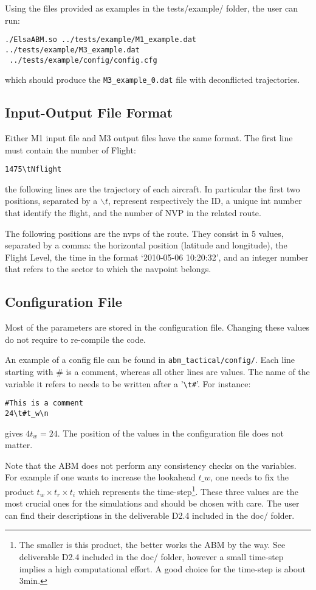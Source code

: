 \documentclass[12pt]{article}
\begin{document}
Using the files provided as examples in the tests/example/ folder, the user can run:
\begin{verbatim}
./ElsaABM.so ../tests/example/M1_example.dat ../tests/example/M3_example.dat
 ../tests/example/config/config.cfg
\end{verbatim}
which should produce the \verb|M3_example_0.dat| file with deconflicted trajectories. 

\subsection{Input-Output File Format}

Either M1 input file and M3 output files have the same format. The first line must contain the number of Flight:
\begin{verbatim}
1475\tNflight
\end{verbatim}
the following lines are the trajectory of each aircraft. In particular the first two positions, separated by a $\backslash t$,  represent respectively the ID, a unique int number that identify the flight, and the number of NVP in the related route. 

The following positions are the nvps of the route. They consist in 5 values, separated by a comma: the horizontal position (latitude and longitude), the Flight Level, the time in the format `2010-05-06 10:20:32', and an integer number that refers to the sector to which the navpoint belongs. 

\subsection{Configuration File}
Most of the parameters are stored in the configuration file. Changing these values do not require to re-compile the code. 

An example of a config file can be found in \verb|abm_tactical/config/|. Each line starting with $\#$ is a comment, whereas all other lines are values. The name of the variable it refers to needs to be written after a '\verb|\t#|'. For instance:
\begin{verbatim}
#This is a comment
24\t#t_w\n
\end{verbatim}
gives $4t_w = 24$. The position of the values in the configuration file does not matter.

Note that the ABM does not perform any consistency checks on the variables. For example if one wants to increase the lookahead $t\_w$, one needs to fix the product $t_w \times t_r \times t_i$ which represents the time-step\footnote{The smaller is this product, the better works the ABM by the way. See deliverable D2.4 included in the doc/ folder, however a small time-step implies a high computational effort. A good choice for the time-step is about 3min.}. These three values are the most crucial ones for the simulations and should be chosen with care. The user can find their descriptions in the deliverable D2.4 included in the doc/ folder.
\\
\end{document}
